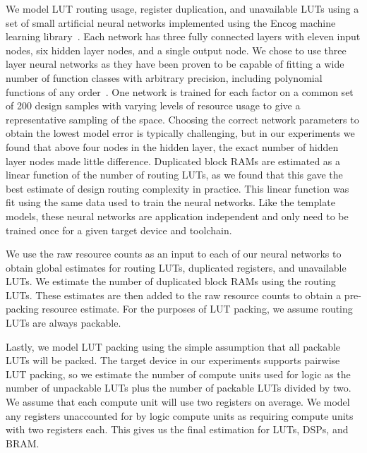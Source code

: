 We model LUT routing usage, register duplication, and unavailable LUTs using a set of small artificial
neural networks implemented using the Encog machine learning library~\cite{encog}.
Each network has three fully connected layers with eleven input nodes, six hidden layer nodes, and a single output node. We chose to use
three layer neural networks as they have been proven to be capable of fitting a wide number of function classes with arbitrary precision, including polynomial functions of any order~\cite{science}.
One network is trained
for each factor on a common set of 200 design samples with varying levels of resource usage to give a representative sampling of the space. Choosing the correct
network parameters to obtain the lowest model error is typically challenging, but in our experiments we found that above four nodes in the hidden layer,
the exact number of hidden layer nodes made little difference.
Duplicated block RAMs are estimated as a linear function of the number of routing LUTs, as we found that this gave the best estimate of design routing complexity in practice. This linear function was fit using the same data used to train the neural networks. Like the template models, these neural networks are application independent and only need to be trained once for a given target device and toolchain.

We use the raw resource counts as an input to each of our neural networks to obtain global estimates for routing LUTs,
duplicated registers, and unavailable LUTs. We estimate the number of duplicated block RAMs using the routing LUTs.
These estimates are then added to the raw resource counts to obtain a pre-packing resource estimate. For the purposes
of LUT packing, we assume routing LUTs are always packable.

Lastly, we model LUT packing using the simple assumption that all packable LUTs will be packed. The target device
in our experiments supports pairwise LUT packing, so we estimate the number of compute units used for logic as
the number of unpackable LUTs plus the number of packable LUTs divided by two. We assume that each compute unit
will use two registers on average. We model any registers unaccounted for by logic compute units as requiring
compute units with two registers each. This gives us the final estimation for LUTs, DSPs, and BRAM.


